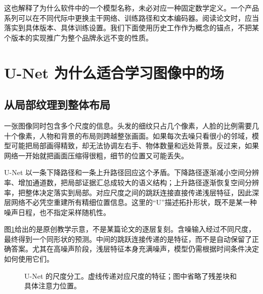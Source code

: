 这也解释了为什么软件中的一个模型名称，未必对应一种固定数学定义。一个产品系列可以在不同代际中更换主干网络、训练路径和文本编码器。阅读论文时，应当落实到具体版本、具体训练设置。我们下面使用历史工作作为概念的锚点，不把某个版本的实现推广为整个品牌永远不变的性质。

\section{U-Net 为什么适合学习图像中的场}
\label{sec:application-unet}

\subsection{从局部纹理到整体布局}

一张图像同时包含多个尺度的信息。头发的细纹只占几个像素，人脸的比例需要几十个像素，人物和背景的布局则跨越整张画面。如果每次去噪只看很小的邻域，模型可能把局部画得精致，却无法协调左右手、物体数量和远处背景。反过来，如果网络一开始就把画面压缩得很粗，细节的位置又可能丢失。

U-Net 以一条下降路径和一条上升路径回应这个矛盾。下降路径逐渐减小空间分辨率、增加通道数，把局部证据汇总成较大的语义结构；上升路径逐渐恢复空间分辨率，把整体决定落实到局部。对应尺度之间的跳跃连接直接传递浅层特征，因此深层网络不必凭空重建所有精细位置信息。这里的“U”描述拓扑形状，既不是某一种噪声日程，也不指定采样随机性。

图\ref{fig:application-unet}给出的是原创教学示意，不是某篇论文的逐层复刻。含噪输入经过不同尺度，最终得到一个同形状的预测。中间的跳跃连接传递的是特征，而不是自动保留了正确答案。尤其在高噪声阶段，浅层特征本身充满噪声，模型仍需根据时间条件决定如何使用它们。

\begin{figure}[htbp]
\centering
{}
\caption{U-Net 的尺度分工。虚线传递对应尺度的特征；图中省略了残差块和具体注意力位置。}
\label{fig:application-unet}
\end{figure}

